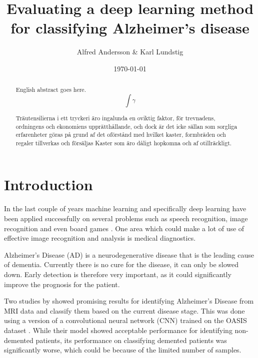 \documentclass{kththesis}
\title{Evaluating a deep learning method for classifying Alzheimer's disease}
\author{Alfred Andersson \& Karl Lundstig}
\date{\today}
\begin{document}
\frontmatter

\titlepage

\begin{abstract}
  English abstract goes here.
  $$\int \gamma$$

\end{abstract}


\begin{otherlanguage}{swedish}
  \begin{abstract}
    Träutensilierna i ett tryckeri äro ingalunda en oviktig faktor,
    för trevnadens, ordningens och ekonomiens upprätthållande, och
    dock är det icke sällan som sorgliga erfarenheter göras på grund
    af det oförstånd med hvilket kaster, formbräden och regaler
    tillverkas och försäljas Kaster som äro dåligt hopkomna och af
    otillräckligt.
  \end{abstract}
\end{otherlanguage}


\tableofcontents


\mainmatter

\chapter{Introduction}

In the last couple of years machine learning and specifically deep learning have been applied successfully on several problems such as speech recognition, image recognition \parencite{krizhevsky2012imagenet} and even board games \parencite{silver2018general}. One area which could make a lot of use of effective image recognition and analysis is medical diagnostics.

Alzheimer’s Disease (AD) is a neurodegenerative disease that is the leading cause of dementia. Currently there is no cure for the disease, it can only be slowed down. Early detection is therefore very important, as it could significantly improve the prognosis for the patient.

Two studies by \textcite{islam2017novel, islam2018early} showed promising results for identifying Alzheimer’s Disease from MRI data and classify them based on the current disease stage. This was done using a version of a convolutional neural network (CNN) trained on the OASIS dataset \parencite{marcus2010open}. While their model showed acceptable performance for identifying non-demented patients, its performance on classifying demented patients was significantly worse, which could be because of the limited number of samples. 
\end{document}
